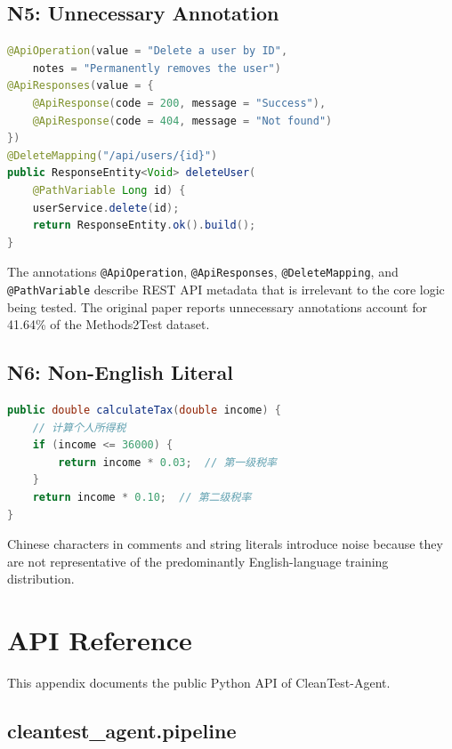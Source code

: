 \documentclass[acmlarge,nonacm,screen]{acmart}
\begin{document}
\subsection{N5: Unnecessary Annotation}

\begin{lstlisting}[language=Java,caption={Focal method with API documentation annotations}]
@ApiOperation(value = "Delete a user by ID",
    notes = "Permanently removes the user")
@ApiResponses(value = {
    @ApiResponse(code = 200, message = "Success"),
    @ApiResponse(code = 404, message = "Not found")
})
@DeleteMapping("/api/users/{id}")
public ResponseEntity<Void> deleteUser(
    @PathVariable Long id) {
    userService.delete(id);
    return ResponseEntity.ok().build();
}
\end{lstlisting}

The annotations \texttt{@ApiOperation}, \texttt{@ApiResponses}, \texttt{@DeleteMapping}, and \texttt{@PathVariable} describe REST API metadata that is irrelevant to the core logic being tested. The original paper reports unnecessary annotations account for 41.64\% of the Methods2Test dataset.

\subsection{N6: Non-English Literal}

\begin{lstlisting}[language=Java,caption={Focal method with Chinese comments}]
public double calculateTax(double income) {
    // 计算个人所得税
    if (income <= 36000) {
        return income * 0.03;  // 第一级税率
    }
    return income * 0.10;  // 第二级税率
}
\end{lstlisting}

Chinese characters in comments and string literals introduce noise because they are not representative of the predominantly English-language training distribution.


\section{API Reference}
\label{appendix:api}

This appendix documents the public Python API of CleanTest-Agent.

\subsection{cleantest\_agent.pipeline}
\end{document}
